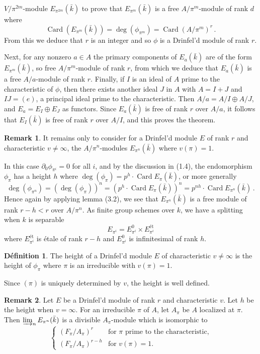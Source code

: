 \documentclass[12pt,a4paper]{article}
\theoremstyle{plain}
\theoremstyle{definition}
\newtheorem{definition}{D\'efinition}[section]
\newtheorem{remark}{Remark}[section]
\theoremstyle{remark}
\DeclareMathOperator{\Card}{Card}
\begin{document}
\setcounter{section}{0}
\setcounter{page}{36}

$V/\pi^{2m}$-module $E_{\pi^{2m}}(\bar{k})$ to prove that $E_{\pi^m}(\bar{k})$ 
is a free $A/\pi^m$-module of rank $d$ where
\[
\Card(E_{\pi^m}(\bar{k})) = \deg(\phi_{\pi^m}) = \Card(A/\pi^m)^r \,.
\]
From this we deduce that $r$ is an integer and so $\phi$ is a Drinfel'd module 
of rank $r$.

Next, for any nonzero $a \in A$ the primary components of $E_a(\bar{k})$ are of 
the form $E_{\pi^m}(\bar{k})$, so free $A/\pi^m$-module of rank $r$, from which 
we deduce that $E_a(\bar{k})$ is a free $A/a$-module of rank $r$. Finally, if $I$ 
is an ideal of $A$ prime to the characteristic of $\phi$, then there exists 
another ideal $J$ in $A$ with $A = I + J$ and $IJ = (e)$, a principal ideal 
prime to the characteristic. Then $A/a = A/I \oplus A/J$, and 
$E_a = E_I \oplus E_J$ as functors. Since $E_a(\bar{k})$ is free of rank $r$ 
over $A/a$, it follows that $E_I(\bar{k})$ is free of rank $r$ over $A/I$, and 
this proves the theorem.

\begin{remark}
It remains only to consider for a Drinfel'd module $E$ of rank $r$ and 
characteristic $v \neq \infty$, the $A/\pi^n$-modules $E_{\pi^n}(\bar{k})$ where 
$v(\pi) = 1$.

In this case $\partial_0\phi_{\pi^i} = 0$ for all $i$, and by the discussion in 
(1.4), the endomorphism $\phi_\pi$ has a height $h$ where 
$\deg(\phi_\pi) = p^h \cdot \Card E_\pi(\bar{k})$, or more generally
\[
\deg(\phi_{\pi^n}) = (\deg(\phi_\pi))^n = (p^h \cdot \Card E_\pi(\bar{k}))^n 
= p^{nh} \cdot \Card E_{\pi^n}(\bar{k}) \,.
\]
Hence again by applying lemma (3.2), we see that $E_{\pi^n}(\bar{k})$ is a free 
module of rank $r - h < r$ over $A/\pi^n$. As finite group schemes over $k$, 
we have a splitting when $k$ is separable
\[
E_{\pi^i} = E_{\pi^i}^0 \times E_{\pi^i}^{\text{\'et}}
\]
where $E_{\pi^i}^{\text{\'et}}$ is \'etale of rank $r - h$ and 
$E_{\pi^i}^0$ is infinitesimal of rank $h$.
\end{remark}

\begin{definition}
The height of a Drinfel'd module $E$ of characteristic $v \neq \infty$ is the 
height of $\phi_\pi$ where $\pi$ is an irreducible with $v(\pi) = 1$.
\end{definition}

Since $(\pi)$ is uniquely determined by $v$, the height is well defined.

\begin{remark}
Let $E$ be a Drinfel'd module of rank $r$ and characteristic $v$. Let $h$ be 
the height when $v = \infty$. For an irreducible $\pi$ of $A$, let $A_\pi$ be 
$A$ localized at $\pi$. Then $\varinjlim_n E_{\pi^n}(\bar{k})$ is a divisible 
$A_\pi$-module which is isomorphic to
\[
\begin{cases}
(F_\pi/A_\pi)^r & \text{for $\pi$ prime to the characteristic,} \\[2mm]
(F_\pi/A_\pi)^{r-h} & \text{for $v(\pi) = 1$.}
\end{cases}
\]
\end{remark}
\end{document}
